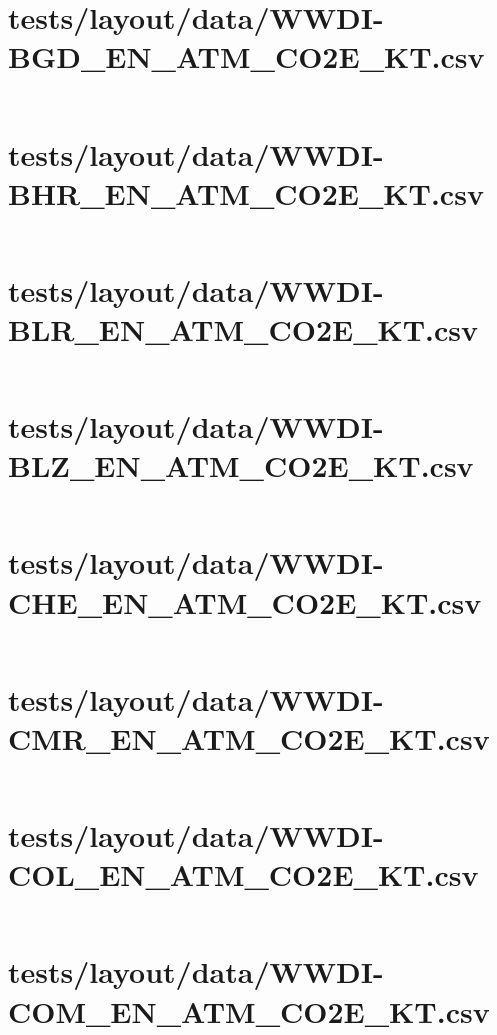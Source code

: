 \documentclass[a4paper]{article}
\begin{document}
\section{tests/layout/data/WWDI-BGD\_EN\_ATM\_CO2E\_KT.csv}
\inputminted[linenos,breaklines,breakbytoken]{text}{tests/layout/data/WWDI-BGD_EN_ATM_CO2E_KT.csv}

\section{tests/layout/data/WWDI-BHR\_EN\_ATM\_CO2E\_KT.csv}
\inputminted[linenos,breaklines,breakbytoken]{text}{tests/layout/data/WWDI-BHR_EN_ATM_CO2E_KT.csv}

\section{tests/layout/data/WWDI-BLR\_EN\_ATM\_CO2E\_KT.csv}
\inputminted[linenos,breaklines,breakbytoken]{text}{tests/layout/data/WWDI-BLR_EN_ATM_CO2E_KT.csv}

\section{tests/layout/data/WWDI-BLZ\_EN\_ATM\_CO2E\_KT.csv}
\inputminted[linenos,breaklines,breakbytoken]{text}{tests/layout/data/WWDI-BLZ_EN_ATM_CO2E_KT.csv}

\section{tests/layout/data/WWDI-CHE\_EN\_ATM\_CO2E\_KT.csv}
\inputminted[linenos,breaklines,breakbytoken]{text}{tests/layout/data/WWDI-CHE_EN_ATM_CO2E_KT.csv}

\section{tests/layout/data/WWDI-CMR\_EN\_ATM\_CO2E\_KT.csv}
\inputminted[linenos,breaklines,breakbytoken]{text}{tests/layout/data/WWDI-CMR_EN_ATM_CO2E_KT.csv}

\section{tests/layout/data/WWDI-COL\_EN\_ATM\_CO2E\_KT.csv}
\inputminted[linenos,breaklines,breakbytoken]{text}{tests/layout/data/WWDI-COL_EN_ATM_CO2E_KT.csv}

\section{tests/layout/data/WWDI-COM\_EN\_ATM\_CO2E\_KT.csv}
\inputminted[linenos,breaklines,breakbytoken]{text}{tests/layout/data/WWDI-COM_EN_ATM_CO2E_KT.csv}
\end{document}
